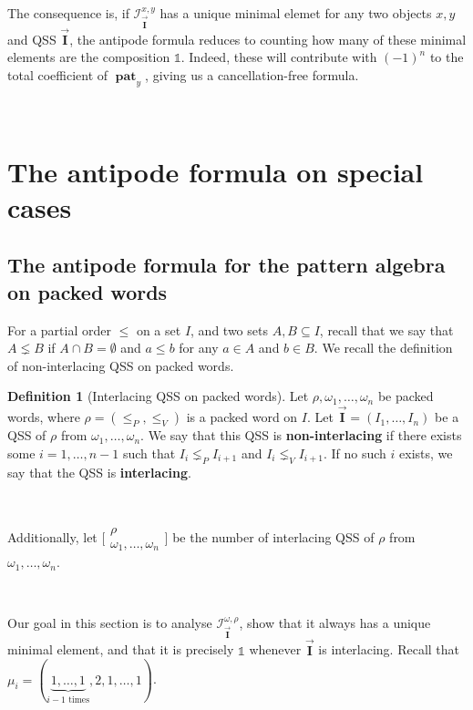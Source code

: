 \documentclass[12pt, reqno]{amsart}
\theoremstyle{definition}
\newtheorem{defin}[thm]{Definition}
\newcommand{\III}{\vec{\mathbf{I}}}
\DeclareMathOperator{\pat}{\mathbf{pat}}
\begin{document}

\

The consequence is, if $\mathcal I_{\III}^{x, y}$ has a unique minimal elemet for any two objects $x, y$ and QSS $\III$, the antipode formula reduces to counting how many of these minimal elements are the composition $\mathbb{1}$.
Indeed, these will contribute with $(-1)^n$ to the total coefficient of $\pat_y$, giving us a cancellation-free formula.

\

\section{The antipode formula on special cases\label{sec:formula_pp}}
\subsection{The antipode formula for the pattern algebra on packed words\label{sec:formula_packed}}
For a partial order $\leq$ on a set $I$, and two sets $A, B \subseteq I$, recall that we say that $A \lneq B$ if $A\cap B = \emptyset$ and $a \leq b$ for any $a \in A$ and $b \in B$.
We recall the definition of non-interlacing QSS on packed words.


\begin{defin}[Interlacing QSS on packed words]
Let $\rho, \omega_1, \dots, \omega_n$ be packed words, where $\rho = (\leq_P, \leq_V)$ is a packed word on $I$.
Let $\III = (I_1, \dots, I_n)$ be a QSS of $\rho$ from $\omega_1, \dots, \omega_n$.
We say that this QSS is \textbf{non-interlacing} if there exists some $i = 1, \dots, n-1$ such that $I_i \lneq_P I_{i+1}$ and $I_i \lneq_V I_{i+1}$.
If no such $i$ exists, we say that the QSS is \textbf{interlacing}.

\

Additionally, let $ \bigl[\!\begin{smallmatrix} \rho  \\ \omega_1, \dots, \omega_n \end{smallmatrix}\!\bigr]$ be the number of interlacing QSS of $\rho$ from $\omega_1, \dots, \omega_n$.
\end{defin}

\

Our goal in this section is to analyse $\mathcal I^{\omega, \rho}_{\III}$, show that it always has a unique minimal element, and that it is precisely $\mathbb{1}$ whenever $\III$ is interlacing.
Recall that $\mu_i = (\underbrace{1, \dots , 1}_\text{$i-1$ times}, 2, 1, \dots, 1)$.
\end{document}

